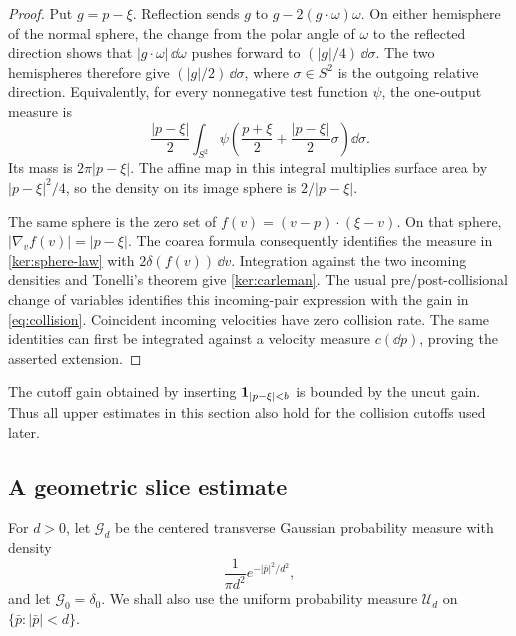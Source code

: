 \begin{proof}
Put $g=p-\xi$. Reflection sends $g$ to
$g-2(g\cdot\omega)\omega$. On either hemisphere of the normal sphere,
the change from the polar angle of $\omega$ to the reflected direction
shows that $|g\cdot\omega|\,\dd\omega$ pushes forward to
$(|g|/4)\,\dd\sigma$. The two hemispheres therefore give
$(|g|/2)\,\dd\sigma$, where $\sigma\in S^2$ is the outgoing relative
direction. Equivalently, for every nonnegative test function $\psi$,
the one-output measure is
\begin{equation}\label{ker:sphere-law}
 \frac{|p-\xi|}{2}\int_{S^2}
 \psi\left(\frac{p+\xi}{2}
                 +\frac{|p-\xi|}{2}\sigma\right)\dd\sigma.
\end{equation}
Its mass is $2\pi|p-\xi|$. The affine map in this integral multiplies
surface area by $|p-\xi|^2/4$, so the density on its image sphere is
$2/|p-\xi|$.

The same sphere is the zero set of
$f(v)=(v-p)\cdot(\xi-v)$. On that sphere,
$|\nabla_v f(v)|=|p-\xi|$. The coarea formula consequently identifies
the measure in \eqref{ker:sphere-law} with $2\delta(f(v))\,\dd v$.
Integration against the two incoming densities and Tonelli's theorem
give \eqref{ker:carleman}. The usual pre/post-collisional change of
variables identifies this incoming-pair expression with the gain in
\eqref{eq:collision}. Coincident incoming velocities have zero
collision rate. The same identities can first be integrated against a
velocity measure $c(\dd p)$, proving the asserted extension.
\end{proof}

The cutoff gain obtained by inserting $\mathbf 1_{|p-\xi|<b}$ is bounded by
the uncut gain. Thus all upper estimates in this section also hold for
the collision cutoffs used later.

\subsection{A geometric slice estimate}

For $d>0$, let $\mathcal G_d$ be the centered transverse Gaussian
probability measure with density
\[
 \frac{1}{\pi d^2}e^{-|\bar p|^2/d^2},
\]
and let $\mathcal G_0=\delta_0$. We shall also use the uniform
probability measure $\mathcal U_d$ on $\{\bar p:|\bar p|<d\}$.

